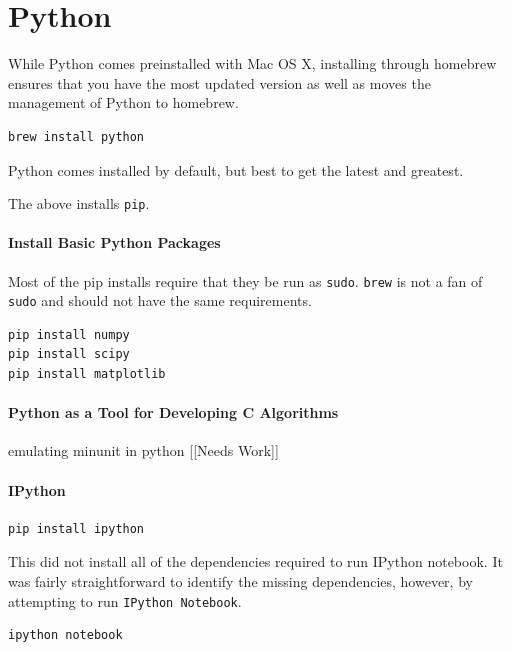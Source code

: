 \documentclass[12pt,]{book}
\let\oldparagraph\paragraph
\renewcommand{\paragraph}[1]{\oldparagraph{#1}\mbox{}}
\begin{document}
\section{Python}\label{python}

While Python comes preinstalled with Mac OS X, installing through
homebrew ensures that you have the most updated version as well as moves
the management of Python to homebrew.

\begin{verbatim}
brew install python 
\end{verbatim}

Python comes installed by default, but best to get the latest and
greatest.

The above installs \texttt{pip}.

\paragraph{Install Basic Python Packages}

Most of the pip installs require that they be run as \texttt{sudo}.
\texttt{brew} is not a fan of \texttt{sudo} and should not have the same
requirements.

\begin{verbatim}
pip install numpy
pip install scipy
pip install matplotlib
\end{verbatim}

\paragraph{Python as a Tool for Developing C Algorithms}

emulating minunit in python {[}{[}Needs Work{]}{]}

\paragraph{IPython}

\begin{verbatim}
pip install ipython
\end{verbatim}

This did not install all of the dependencies required to run IPython
notebook. It was fairly straightforward to identify the missing
dependencies, however, by attempting to run \texttt{IPython\ Notebook}.

\begin{verbatim}
ipython notebook 
\end{verbatim}
\end{document}
